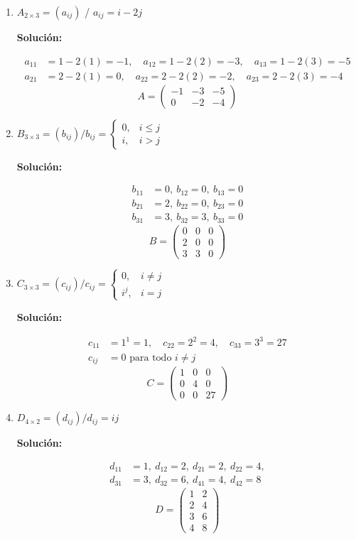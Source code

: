 \documentclass[12pt]{article}
\newcommand{\solucion}{%
    \vspace{0.8em}%
    \textbf{Solución:}%
}
\begin{document}
\begin{enumerate}[label=\alph*.-]
    \item $A_{2\times3} = (a_{ij})$ / $a_{ij} = i - 2j$

    \solucion
    \[
    \begin{aligned}
    a_{11} &= 1-2(1)=-1, \quad a_{12}=1-2(2)=-3, \quad a_{13}=1-2(3)=-5\\
    a_{21} &= 2-2(1)=0,  \quad a_{22}=2-2(2)=-2, \quad a_{23}=2-2(3)=-4
    \end{aligned}
    \]
    \[
    A = \begin{pmatrix} -1 & -3 & -5 \\ 0 & -2 & -4 \end{pmatrix}
    \]

    \item $B_{3\times3} = (b_{ij})/b_{ij} = \begin{cases} 0, & i \leq j \\ i, & i > j \end{cases}$

    \solucion
    \[
    \begin{aligned}
    b_{11}&=0,\ b_{12}=0,\ b_{13}=0\\
    b_{21}&=2,\ b_{22}=0,\ b_{23}=0\\
    b_{31}&=3,\ b_{32}=3,\ b_{33}=0
    \end{aligned}
    \]
    \[
    B = \begin{pmatrix} 0 & 0 & 0 \\ 2 & 0 & 0 \\ 3 & 3 & 0 \end{pmatrix}
    \]

    \item $C_{3\times3} = (c_{ij})/c_{ij} = \begin{cases} 0, & i \neq j \\ i^j, & i = j \end{cases}$

    \solucion
    \[
    \begin{aligned}
    c_{11}&=1^1=1,\quad c_{22}=2^2=4,\quad c_{33}=3^3=27\\
    c_{ij}&=0 \text{ para todo } i\neq j
    \end{aligned}
    \]
    \[
    C = \begin{pmatrix} 1 & 0 & 0 \\ 0 & 4 & 0 \\ 0 & 0 & 27 \end{pmatrix}
    \]

    \item $D_{4\times2} = (d_{ij})/d_{ij} = ij$

    \solucion
    \[
    \begin{aligned}
    d_{11}&=1,\ d_{12}=2,\ d_{21}=2,\ d_{22}=4,\\
    d_{31}&=3,\ d_{32}=6,\ d_{41}=4,\ d_{42}=8
    \end{aligned}
    \]
    \[
    D = \begin{pmatrix} 1 & 2 \\ 2 & 4 \\ 3 & 6 \\ 4 & 8 \end{pmatrix}
    \]
\end{enumerate}
\end{document}
